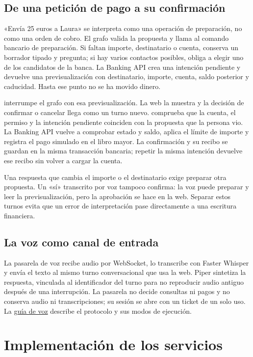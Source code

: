 \documentclass[12pt,a4paper]{article}
\begin{document}
\subsection{De una petición de pago a su confirmación}
\label{sec:payment}
«Envía 25 euros a Laura» se interpreta como una operación de preparación, no como una orden de cobro. El grafo valida la propuesta y llama al comando bancario de preparación. Si faltan importe, destinatario o cuenta, conserva un borrador tipado y pregunta; si hay varios contactos posibles, obliga a elegir uno de los candidatos de la banca. La Banking API crea una intención pendiente y devuelve una previsualización con destinatario, importe, cuenta, saldo posterior y caducidad. Hasta ese punto no se ha movido dinero.

 interrumpe el grafo con esa previsualización. La web la muestra y la decisión de confirmar o cancelar llega como un turno nuevo.  comprueba que la cuenta, el permiso y la intención pendiente coinciden con la propuesta que la persona vio. La Banking API vuelve a comprobar estado y saldo, aplica el límite de importe y registra el pago simulado en el libro mayor. La confirmación y su recibo se guardan en la misma transacción bancaria; repetir la misma intención devuelve ese recibo sin volver a cargar la cuenta.

Una respuesta que cambia el importe o el destinatario exige preparar otra propuesta. Un «sí» transcrito por voz tampoco confirma: la voz puede preparar y leer la previsualización, pero la aprobación se hace en la web. Separar estos turnos evita que un error de interpretación pase directamente a una escritura financiera.

\subsection{La voz como canal de entrada}
La pasarela de voz recibe audio por WebSocket, lo transcribe con Faster Whisper y envía el texto al mismo turno conversacional que usa la web. Piper sintetiza la respuesta, vinculada al identificador del turno para no reproducir audio antiguo después de una interrupción. La pasarela no decide consultas ni pagos y no conserva audio ni transcripciones; su sesión se abre con un ticket de un solo uso. La \href{https://github.com/adrianoggm/FinGuard/blob/main/apps/voice-gateway/README.md}{guía de voz} describe el protocolo y sus modos de ejecución.

\section{Implementación de los servicios}
\end{document}
